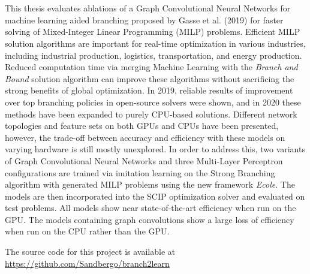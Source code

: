 \chapter*{\englishabstractname}
%
This thesis evaluates ablations of a Graph Convolutional Neural Networks for machine learning aided branching proposed by Gasse et al. (2019)
for faster solving of Mixed-Integer Linear Programming (\gls{MILP}) problems. 
Efficient \gls{MILP} solution algorithms are important for real-time optimization in various industries, including industrial production, logistics, transportation, and energy production.  Reduced computation time via merging Machine Learning with the \textit{Branch and Bound} solution algorithm can improve these algorithms without sacrificing the strong benefits of global optimization.
In 2019, reliable results of improvement over top branching policies in open-source solvers were shown, and in 2020 these methods have been expanded to purely \gls{CPU}-based solutions. Different network topologies and feature sets on both \gls{GPU}s and \gls{CPU}s have been presented, however, the trade-off between accuracy and efficiency with these models on varying hardware is still mostly unexplored.
In order to address this, two variants of Graph Convolutional Neural Networks and three Multi-Layer Perceptron configurations are trained via imitation learning on the Strong Branching algorithm with generated \gls{MILP} problems using the new framework \textit{\gls{Ecole}}.  The models are then incorporated into the \gls{SCIP} optimization solver and evaluated on test problems. All models show near state-of-the-art efficiency when run on the \gls{GPU}. The models containing graph convolutions show a large loss of efficiency when run on the \gls{CPU} rather than the \gls{GPU}.

The source code for this project is available at\\ \url{https://github.com/Sandbergo/branch2learn}

%
\clearpage
